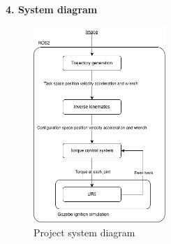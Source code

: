 \documentclass[10pt]{article}
\begin{document}
\large
\noindent
\textbf{4. System diagram} \\
\normalsize
\indent
\begin{figure}[h]
    \centering
    \includegraphics[width=5cm,keepaspectratio]{img/system_diagram.png}
    \caption{Project system diagram}
    \label{fig:system diagram} 
\end{figure}
\vspace*{-0.5\baselineskip} 
\end{document}
